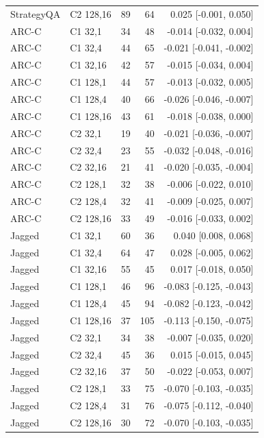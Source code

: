 \begin{table}[h!]
\begin{tabular}{llrrr}
StrategyQA & C2 128,16 & 89 & 64 & 0.025 [-0.001, 0.050] \\
ARC-C & C1 32,1 & 34 & 48 & -0.014 [-0.032, 0.004] \\
ARC-C & C1 32,4 & 44 & 65 & -0.021 [-0.041, -0.002] \\
ARC-C & C1 32,16 & 42 & 57 & -0.015 [-0.034, 0.004] \\
ARC-C & C1 128,1 & 44 & 57 & -0.013 [-0.032, 0.005] \\
ARC-C & C1 128,4 & 40 & 66 & -0.026 [-0.046, -0.007] \\
ARC-C & C1 128,16 & 43 & 61 & -0.018 [-0.038, 0.000] \\
ARC-C & C2 32,1 & 19 & 40 & -0.021 [-0.036, -0.007] \\
ARC-C & C2 32,4 & 23 & 55 & -0.032 [-0.048, -0.016] \\
ARC-C & C2 32,16 & 21 & 41 & -0.020 [-0.035, -0.004] \\
ARC-C & C2 128,1 & 32 & 38 & -0.006 [-0.022, 0.010] \\
ARC-C & C2 128,4 & 32 & 41 & -0.009 [-0.025, 0.007] \\
ARC-C & C2 128,16 & 33 & 49 & -0.016 [-0.033, 0.002] \\
Jagged & C1 32,1 & 60 & 36 & 0.040 [0.008, 0.068] \\
Jagged & C1 32,4 & 64 & 47 & 0.028 [-0.005, 0.062] \\
Jagged & C1 32,16 & 55 & 45 & 0.017 [-0.018, 0.050] \\
Jagged & C1 128,1 & 46 & 96 & -0.083 [-0.125, -0.043] \\
Jagged & C1 128,4 & 45 & 94 & -0.082 [-0.123, -0.042] \\
Jagged & C1 128,16 & 37 & 105 & -0.113 [-0.150, -0.075] \\
Jagged & C2 32,1 & 34 & 38 & -0.007 [-0.035, 0.020] \\
Jagged & C2 32,4 & 45 & 36 & 0.015 [-0.015, 0.045] \\
Jagged & C2 32,16 & 37 & 50 & -0.022 [-0.053, 0.007] \\
Jagged & C2 128,1 & 33 & 75 & -0.070 [-0.103, -0.035] \\
Jagged & C2 128,4 & 31 & 76 & -0.075 [-0.112, -0.040] \\
Jagged & C2 128,16 & 30 & 72 & -0.070 [-0.103, -0.035] \\
\bottomrule
\end{tabular}
\end{table}
